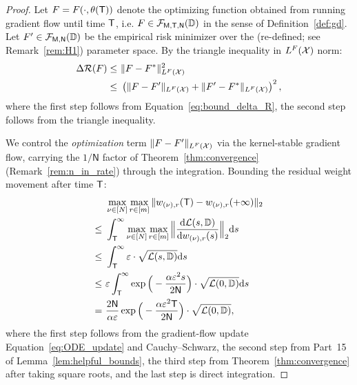 \documentclass[11pt]{article}
\theoremstyle{plain}
\renewcommand{\d}{\mathrm{d}}
\begin{document}
\begin{proof}

    Let $F = F(\cdot, \theta({\sf T}))$ denote the optimizing function obtained from running gradient flow until time $\sf T$, i.e. $F \in {\cal F}_{\sf M, T, N}(\mathbb{D})$ in the sense of Definition~\ref{def:gd}. Let $F' \in {\cal F}_{\sf M, N}(\mathbb{D})$ be the empirical risk minimizer over the (re-defined; see Remark~\ref{rem:H1}) parameter space. By the triangle inequality in $L^F({\cal X})$ norm:
    \begin{align*}
        \Delta {\cal R}(F) \leq & ~ \| F - F^*\|_{L^F({\cal X})}^2 \\
        \leq & ~ \left(\| F - F'\|_{L^F({\cal X})} + \| F' - F^*\|_{L^F({\cal X})}\right)^2,
    \end{align*}
    where the first step follows from Equation~\eqref{eq:bound_delta_R}, the second step follows from the triangle inequality.

    We control the {\it optimization} term $\|F-F'\|_{L^F({\cal X})}$ via the kernel-stable gradient flow, carrying the $1/\mathsf{N}$ factor of Theorem~\ref{thm:convergence} (Remark~\ref{rem:n_in_rate}) through the integration. Bounding the residual weight movement after time $\sf T$:
    \begin{align*}
        & ~ \max_{\nu\in [N]} \max_{r \in [m]} \| w_{(\nu), r}({\sf T}) -  w_{(\nu), r}(+\infty) \|_2 \notag \\
        \leq & ~   \int_{\sf T}^\infty \max_{\nu\in [N]}\max_{r \in [m]}\Big\| \frac{\d {\cal L}(s, \mathbb{D})}{\d w_{(\nu), r}(s)} \Big\|_2 \d s \notag\\
        \leq & ~  \int_{\sf T}^\infty \varepsilon \cdot \sqrt{{\cal L}(s, \mathbb{D})  }\d s \notag\\
        \leq & ~ \varepsilon \int_{\sf T}^\infty \exp\Big(-\frac{\alpha \varepsilon^2 s}{2\mathsf{N}}\Big) \cdot \sqrt{ {\cal L}(0, \mathbb{D})}\d s \\
        = & ~ \frac{2\mathsf{N}}{\alpha \varepsilon} \exp\Big(-\frac{\alpha \varepsilon^2 \mathsf{T}}{2\mathsf{N}}\Big) \cdot \sqrt{{\cal L}(0, \mathbb{D})},
    \end{align*}
    where the first step follows from the gradient-flow update Equation~\eqref{eq:ODE_update} and Cauchy--Schwarz, the second step from Part~15 of Lemma~\ref{lem:helpful_bounds}, the third step from Theorem~\ref{thm:convergence} after taking square roots, and the last step is direct integration.


\end{proof}
\end{document}
